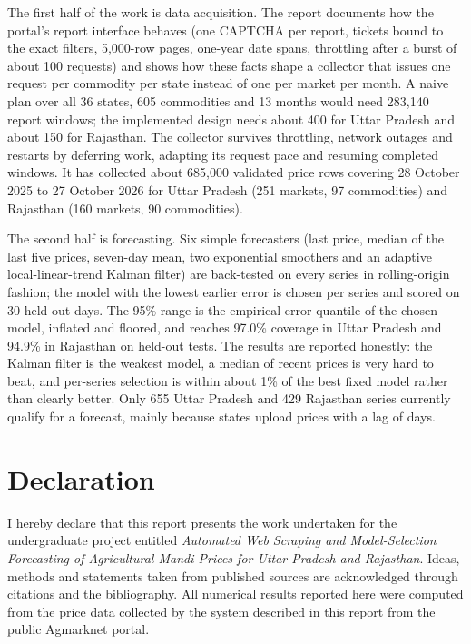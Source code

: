 \documentclass[12pt,a4paper,oneside]{report}
\numberwithin{equation}{chapter}
\numberwithin{figure}{chapter}
\numberwithin{table}{chapter}
\theoremstyle{definition}
\begin{document}
The first half of the work is data acquisition. The report documents how the portal's report interface behaves (one CAPTCHA per report, tickets bound to the exact filters, 5,000-row pages, one-year date spans, throttling after a burst of about 100 requests) and shows how these facts shape a collector that issues one request per commodity per state instead of one per market per month. A naive plan over all 36 states, 605 commodities and 13 months would need 283,140 report windows; the implemented design needs about 400 for Uttar Pradesh and about 150 for Rajasthan. The collector survives throttling, network outages and restarts by deferring work, adapting its request pace and resuming completed windows. It has collected about 685{,}000 validated price rows covering 28 October 2025 to 27 October 2026 for Uttar Pradesh (251 markets, 97 commodities) and Rajasthan (160 markets, 90 commodities).

The second half is forecasting. Six simple forecasters (last price, median of the last five prices, seven-day mean, two exponential smoothers and an adaptive local-linear-trend Kalman filter) are back-tested on every series in rolling-origin fashion; the model with the lowest earlier error is chosen per series and scored on 30 held-out days. The 95\% range is the empirical error quantile of the chosen model, inflated and floored, and reaches 97.0\% coverage in Uttar Pradesh and 94.9\% in Rajasthan on held-out tests. The results are reported honestly: the Kalman filter is the weakest model, a median of recent prices is very hard to beat, and per-series selection is within about 1\% of the best fixed model rather than clearly better. Only 655 Uttar Pradesh and 429 Rajasthan series currently qualify for a forecast, mainly because states upload prices with a lag of days.

\clearpage
\chapter*{Declaration}
I hereby declare that this report presents the work undertaken for the undergraduate project entitled \emph{Automated Web Scraping and Model-Selection Forecasting of Agricultural Mandi Prices for Uttar Pradesh and Rajasthan}. Ideas, methods and statements taken from published sources are acknowledged through citations and the bibliography. All numerical results reported here were computed from the price data collected by the system described in this report from the public Agmarknet portal.
\end{document}
